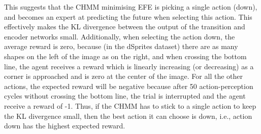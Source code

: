 \documentclass[twoside,11pt]{article}
\providecommand{\DIFaddend}{} %
\providecommand{\DIFdelbegin}{} %
\begin{document}
\DIFaddend This suggests that the CHMM minimising EFE is picking a single action (down), and becomes an expert at predicting the future when selecting this action. This effectively makes the KL divergence between the output of the transition and encoder networks small. Additionally, when selecting the action down, the average reward is zero, because (in the dSprites dataset) there are as many shapes on the left of the image as on the right, and when crossing the bottom line, the agent receives a reward which is linearly increasing (or decreasing) as a corner is approached and is zero at the center of the image. For all the other actions, the expected reward will be negative because after 50 action-perception cycles without crossing the bottom line, the trial is interrupted and the agent receive a reward of -1. Thus, if the CHMM has to stick to a single action to keep the KL divergence  small, then the best action it can choose is down, i.e., action down has the highest expected reward.

\DIFdelbegin %
{%
}%
{%
}%
{%
}%
{%
}%
\end{document}
